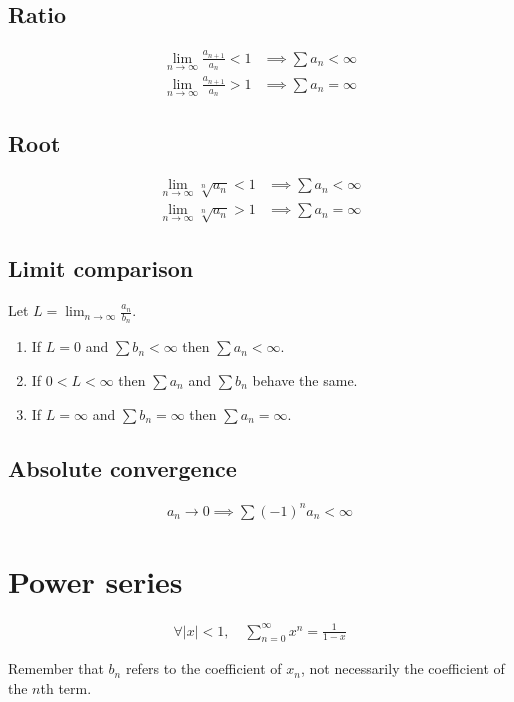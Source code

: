 \documentclass[12pt]{article}
\newcommand{\abs}  [1]{\left|       #1 \right|      }
\begin{document}
\begin{multicols}{2}
\subsection*{Ratio}
\begin{align*}
    \lim_{n\to\infty} \frac{a_{n+1}}{a_n} < 1 &\implies \sum a_n < \infty\\
    \lim_{n\to\infty} \frac{a_{n+1}}{a_n} > 1 &\implies \sum a_n = \infty
\end{align*}

\subsection*{Root}
\begin{align*}
    \lim_{n\to\infty} \sqrt[n]{a_n} < 1 &\implies \sum a_n < \infty \\
    \lim_{n\to\infty} \sqrt[n]{a_n} > 1 &\implies \sum a_n = \infty
\end{align*}

\subsection*{Limit comparison}
Let $L = \lim_{n\to\infty} \frac{a_n}{b_n}$.
\begin{enumerate}
    \item If $L=0$ and $\sum b_n < \infty$ then $\sum a_n < \infty$.
    \item If $0<L<\infty$ then $\sum a_n$ and $\sum b_n$ behave the same.
    \item If $L=\infty$ and $\sum b_n = \infty$ then $\sum a_n = \infty$.
\end{enumerate}

\subsection*{Absolute convergence}
\begin{align*}
    a_n \to 0 \implies \sum (-1)^{n} a_n < \infty
\end{align*}



\section*{Power series}
\begin{align*}
    \forall \abs{x} < 1,\quad \sum_{n=0}^\infty x^n = \frac{1}{1-x}
\end{align*}

Remember that $b_n$ refers to the coefficient of $x_n$, not necessarily the coefficient of the $n$th term.


\end{multicols}
\end{document}

